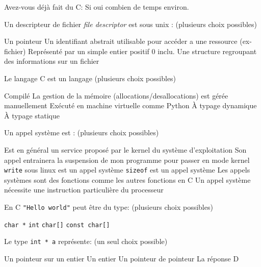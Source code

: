 \documentclass[11pt,a4paper,addpoint]{exam}
\begin{document}
  \begin{questions}
    \question[0] Avez-vous déjà fait du C: Si oui combien de temps environ.
    \vspace{64pt}

    \question[2] Un descripteur de fichier \emph{file descriptor} est sous unix : (plusieurs choix possibles)
    \begin{checkboxes}
      \choice Un pointeur
      \CorrectChoice Un identifiant abstrait utilisable pour accéder a une ressource (ex-fichier)
      \CorrectChoice Représenté par un simple entier positif 0 inclu.
      \choice Une structure regroupant des informations sur un fichier
    \end{checkboxes}

    \question[3] Le langage C est un langage (plusieurs choix possibles)
      \begin{checkboxes}
        \CorrectChoice Compilé
        \CorrectChoice La gestion de la mémoire (allocations/desallocations) est gérée manuellement
        \choice Exécuté en machine virtuelle comme Python
        \choice À typage dynamique
        \CorrectChoice À typage statique
      \end{checkboxes}

    \question[5] Un appel système est : (plusieurs choix possibles)
    \begin{checkboxes}
      \CorrectChoice Est en général un service proposé par le kernel du système d'exploitation
      \CorrectChoice Son appel entrainera la suspension de mon programme pour passer en mode kernel
      \CorrectChoice \texttt{write} sous linux est un appel système
      \choice \texttt{sizeof} est un appel système
      \CorrectChoice Les appels systèmes sont des fonctions comme les autres fonctions en C
      \CorrectChoice Un appel système nécessite une instruction particulière du processeur
    \end{checkboxes}

    \question[3] En C \texttt{"Hello world"} peut être du type: (plusieurs choix possibles)
    \begin{checkboxes}
      \CorrectChoice \texttt{char *}
      \choice \texttt{int}
      \CorrectChoice \texttt{char[]}
      \CorrectChoice \texttt{const char[]}
    \end{checkboxes}

    \newpage
    \question[1] Le type \texttt{int * a} représente: (un seul choix possible)
    \begin{checkboxes}
      \CorrectChoice Un pointeur sur un entier
      \choice Un entier
      \choice Un pointeur de pointeur
      \choice La réponse D
    \end{checkboxes}



\end{questions}
\end{document}
